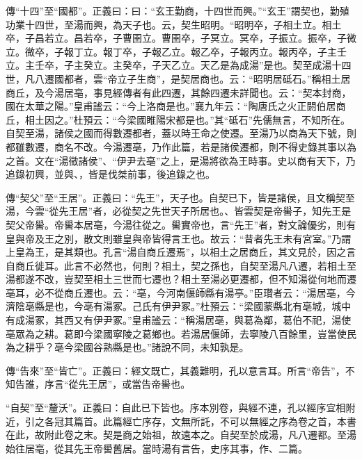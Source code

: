 {\noindent\zhuan{}\fzbyks 傳“十四”至“國都”。正義曰：曰：“玄王勤商，十四世而興。”“玄王”謂契也，勤殖功業十四世，至湯而興，為天子也。云，契生昭明。“昭明卒，子相土立。相土卒，子昌若立。昌若卒，子曹圉立。曹圉卒，子冥立。冥卒，子振立。振卒，子微立。微卒，子報丁立。報丁卒，子報乙立。報乙卒，子報丙立。報丙卒，子主壬立。主壬卒，子主癸立。主癸卒，子天乙立。天乙是為成湯”是也。契至成湯十四世，凡八遷國都者，雲“帝立子生商”，是契居商也。云：“昭明居砥石。”稱相土居商丘，及今湯居亳，事見經傳者有此四遷，其餘四遷未詳聞也。云：“契本封商，國在太華之陽。”皇甫謐云：“今上洛商是也。”襄九年云：“陶唐氏之火正閼伯居商丘，相土因之。”杜預云：“今梁國睢陽宋都是也。”其“砥石”先儒無言，不知所在。自契至湯，諸侯之國而得數遷都者，蓋以時王命之使遷。至湯乃以商為天下號，則都雖數遷，商名不改。今湯遷亳，乃作此篇，若是諸侯遷都，則不得史錄其事以為之首。文在“湯徵諸侯”、“伊尹去亳”之上，是湯將欲為王時事。史以商有天下，乃追錄初興，並與、，皆是伐桀前事，後追錄之也。 \par}

{\noindent\zhuan{}\fzbyks 傳“契父”至“王居”。正義曰：“先王”，天子也。自契已下，皆是諸侯，且文稱契至湯，今雲“從先王居”者，必從契之先世天子所居也。、皆雲契是帝嚳子，知先王是契父帝嚳。帝嚳本居亳，今湯往從之。嚳實帝也，言“先王”者，對文論優劣，則有皇與帝及王之別，散文則雖皇與帝皆得言王也。故云：“昔者先王未有宮室。”乃謂上皇為王，是其類也。孔言“湯自商丘遷焉”，以相土之居商丘，其文見於，因之言自商丘徙耳。此言不必然也，何則？相土，契之孫也，自契至湯凡八遷，若相土至湯都遂不改，豈契至相土三世而七遷也？相土至湯必更遷都，但不知湯從何地而遷亳耳，必不從商丘遷也。云：“亳，今河南偃師縣有湯亭。”臣瓚者云：“湯居亳，今濟陰亳縣是也，今亳有湯冢。己氏有伊尹冢。”杜預云：“梁國蒙縣北有亳城，城中有成湯冢，其西又有伊尹冢。”皇甫謐云：“稱湯居亳，與葛為鄰，葛伯不祀，湯使亳眾為之耕。葛即今梁國寧陵之葛鄉也。若湯居偃師，去寧陵八百餘里，豈當使民為之耕乎？亳今梁國谷熟縣是也。”諸說不同，未知孰是。 \par}

{\noindent\zhuan{}\fzbyks 傳“告來”至“皆亡”。正義曰：經文既亡，其義難明，孔以意言耳。所言“帝告”，不知告誰，序言“從先王居”，或當告帝嚳也。 \par}

{\noindent\shu{}\fzkt “自契”至“釐沃”。正義曰：自此已下皆也。序本別卷，與經不連，孔以經序宜相附近，引之各冠其篇首。此篇經亡序存，文無所託，不可以無經之序為卷之首，本書在此，故附此卷之末。契是商之始祖，故遠本之。自契至於成湯，凡八遷都。至湯始往居亳，從其先王帝嚳舊居。當時湯有言告，史序其事，作、二篇。 \par}

